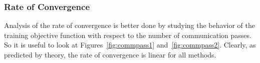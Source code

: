 \documentclass[twoside, 11pt]{article}
\begin{document}
\subsubsection{Rate of Convergence}
\label{subsubsec:rate}

Analysis of the rate of convergence is better done by studying the behavior of the training objective function with respect to the number of communication passes. So it is useful to look at Figures~\ref{fig:commpass1} and~\ref{fig:commpass2}. Clearly, as predicted by theory, the rate of convergence is linear for all methods.


\begin{figure}[H]
\centering
{}



\end{figure}
\end{document}
